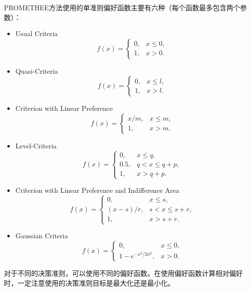 PROMETHEE方法使用的单准则偏好函数主要有六种\cite{brans1985note}（每个函数最多包含两个参数）：
\begin{itemize}
  \item Usual Criteria
  \begin{equation}
    f(x) = \left\{
        \begin{array}{ll}
          0, & x \le 0, \\
          1, & x > 0.
        \end{array}
    \right.
  \end{equation}
  \item Quasi-Criteria
  \begin{equation}
    f(x) = \left\{
        \begin{array}{ll}
          0, & x \le l, \\
          1, & x > l.
        \end{array}
    \right.
  \end{equation}
  \item Criterion with Linear Preference
  \begin{equation}
    f(x) = \left\{
        \begin{array}{ll}
          x/m, & x \le m, \\
          1, & x > m.
        \end{array}
    \right.
  \end{equation}
  \item Level-Criteria
  \begin{equation}
    f(x) = \left\{
        \begin{array}{ll}
          0, & x \le q, \\
          0.5, & q < x \le q + p, \\
          1, & x > q + p.
        \end{array}
    \right.
  \end{equation}
  \item Criterion with Linear Preference and Indifference Area
  \begin{equation}
    f(x) = \left\{
        \begin{array}{ll}
          0, & x \le s, \\
          (x-s)/r, & s < x \le s + r, \\
          1, & x > s + r.
        \end{array}
    \right.
  \end{equation}
  \item Gaussian Criteria
  \begin{equation}
    f(x) = \left\{
        \begin{array}{ll}
          0, & x \le 0, \\
          1-e^{-x^2/2\sigma^2}, & x > 0.
        \end{array}
    \right.
  \end{equation}
\end{itemize}
对于不同的决策准则，可以使用不同的偏好函数。在使用偏好函数计算相对偏好时，一定注意使用的决策准则目标是最大化还是最小化。

